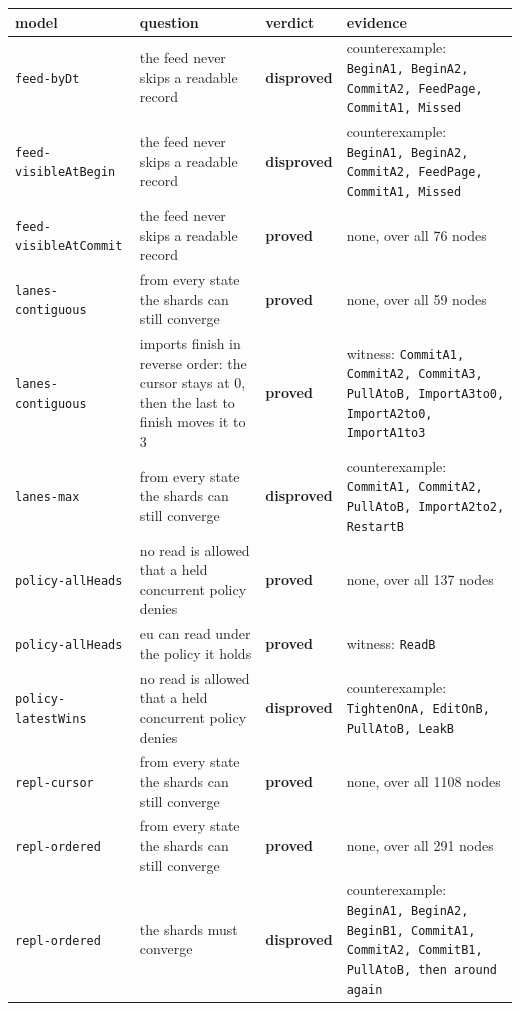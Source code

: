 \begin{longtable}{@{}p{}p{}p{}p{}@{}}
\toprule
model & question & verdict & evidence \\
\midrule
\endhead
\texttt{feed-byDt} & the feed never skips a readable record & \textbf{disproved} & counterexample: \texttt{BeginA1, BeginA2, CommitA2, FeedPage, CommitA1, Missed} \\
\texttt{feed-visibleAtBegin} & the feed never skips a readable record & \textbf{disproved} & counterexample: \texttt{BeginA1, BeginA2, CommitA2, FeedPage, CommitA1, Missed} \\
\texttt{feed-visibleAtCommit} & the feed never skips a readable record & \textbf{proved} & none, over all 76 nodes \\
\texttt{lanes-contiguous} & from every state the shards can still converge & \textbf{proved} & none, over all 59 nodes \\
\texttt{lanes-contiguous} & imports finish in reverse order: the cursor stays at 0, then the last to finish moves it to 3 & \textbf{proved} & witness: \texttt{CommitA1, CommitA2, CommitA3, PullAtoB, ImportA3to0, ImportA2to0, ImportA1to3} \\
\texttt{lanes-max} & from every state the shards can still converge & \textbf{disproved} & counterexample: \texttt{CommitA1, CommitA2, PullAtoB, ImportA2to2, RestartB} \\
\texttt{policy-allHeads} & no read is allowed that a held concurrent policy denies & \textbf{proved} & none, over all 137 nodes \\
\texttt{policy-allHeads} & eu can read under the policy it holds & \textbf{proved} & witness: \texttt{ReadB} \\
\texttt{policy-latestWins} & no read is allowed that a held concurrent policy denies & \textbf{disproved} & counterexample: \texttt{TightenOnA, EditOnB, PullAtoB, LeakB} \\
\texttt{repl-cursor} & from every state the shards can still converge & \textbf{proved} & none, over all 1108 nodes \\
\texttt{repl-ordered} & from every state the shards can still converge & \textbf{proved} & none, over all 291 nodes \\
\texttt{repl-ordered} & the shards must converge & \textbf{disproved} & counterexample: \texttt{BeginA1, BeginA2, BeginB1, CommitA1, CommitA2, CommitB1, PullAtoB, then around again} \\

\end{longtable}
